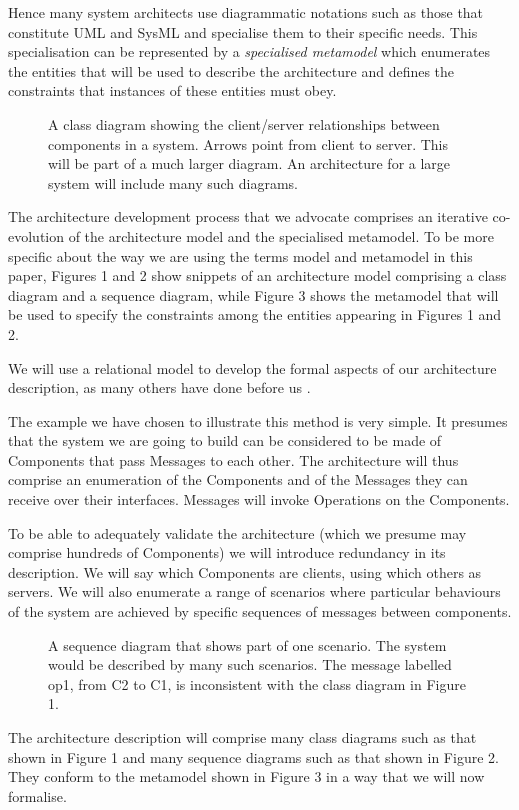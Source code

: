 \documentclass[times, 10pt,twocolumn]{article}
\begin{document}
Hence many system architects use diagrammatic notations such as those that constitute UML and SysML and specialise them to their specific needs. This specialisation can be represented by a {\em specialised metamodel} which enumerates the entities that will be used to describe the architecture and defines the constraints that instances of these entities must obey. 
\begin{figure}[h]
  \centering
   {}
   \caption{A class diagram showing the client/server relationships
between components in a system. Arrows point from client to server. This will be part of a much larger diagram. An architecture for a large system will include many such diagrams.}
\end{figure}
The architecture development process that we advocate comprises an iterative co-evolution of the architecture model and the specialised metamodel. To be more specific about the way we are using the terms model and metamodel in this paper, Figures 1 and 2 show snippets of an architecture model comprising a class diagram and a sequence diagram, while Figure 3 shows the metamodel that will be used to specify the constraints among the entities appearing in Figures 1 and 2.


\noindent We will use a relational model to develop the formal aspects of our architecture description, as many others have done before us \cite{Crocopat,Crocopat2,Holt,Alloy}. 

The example we have chosen to illustrate this method is very simple. It presumes that the system we are going to build can be considered to be made of Components that pass Messages to each other. The architecture will thus comprise an enumeration of the Components and of the Messages they can receive over their interfaces. Messages will invoke Operations on the Components.

To be able to adequately validate the architecture (which we presume may comprise hundreds of Components) we will introduce redundancy in its description. We will say which Components are clients, using which others as servers. We will also enumerate a range of scenarios where particular behaviours of the system are achieved by specific sequences of messages between components.
\begin{figure}[h]
  \centering
   {}
   \caption{A sequence diagram that shows part of one scenario. The system would be described by many such scenarios. The message labelled op1, from C2 to C1, is inconsistent with the class diagram in Figure 1.}
\end{figure}
The architecture description will comprise many class diagrams such as that shown in Figure 1 and many sequence diagrams such as that shown in Figure 2. They conform to the metamodel shown in Figure 3 in a way that we will now formalise.
\end{document}
